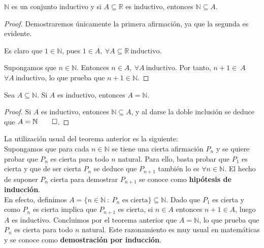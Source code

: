 \begin{teo}
    $\mathbb{N}$ es un conjunto inductivo y si $A \subseteq \mathbb{R}$ es inductivo, entonces $\mathbb{N} \subseteq A$.
\end{teo}
\begin{proof}
    Demostraremos únicamente la primera afirmación, ya que la segunda es evidente.
    
    Es claro que $1 \in \mathbb{N}$, pues $1 \in A, ~\forall A \subseteq \mathbb{R} ~\text{inductivo}$.
    
    Supongamos que $n \in \mathbb{N}$. Entonces $n \in A, ~\forall A ~\text{inductivo}$. Por tanto,
    $n+1 \in~A$ $\forall A ~\text{inductivo}$, lo que prueba que $n+1 \in \mathbb{N}$.
\end{proof}

\begin{teo}
    Sea $A \subseteq \mathbb{N}$. Si $A$ es inductivo, entonces $A = \mathbb{N}$.
\end{teo}
\begin{proof}
    Si $A$ es inductivo, entonces $\mathbb{N} \subseteq A$, y al darse la doble inclusión se deduce que $A = \mathbb{N} \qed$.
\end{proof}

\vspace{0.5cm}
La utilización usual del teorema anterior es la siguiente:\\

Supongamos que para cada $n \in \mathbb{N}$ se tiene una cierta afirmación $P_n$ y se quiere probar que
$P_n$ es cierta para todo $n$ natural. Para ello, basta probar que $P_1$ es cierta y que de ser cierta
$P_n$ se deduce que $P_{n+1}$ también lo es $\forall n \in \mathbb{N}$. El hecho de suponer
$P_n$ cierta para demostrar $P_{n+1}$ se conoce como \textbf{hipótesis de inducción}.\\

En efecto, definimos $A = \{n \in \mathbb{N} ~:~\text{$P_n$ es cierta}\} \subseteq \mathbb{N}$. Dado que $P_1$ es cierta y como
$P_n$ es cierta implica que $P_{n+1}$ es cierta, si $n \in A$ entonces $n+1 \in A$, luego $A$
es inductivo. Concluimos por el teorema anterior que $A = \mathbb{N}$, lo que prueba que $P_n$ es cierta para todo $n$
natural. Este razonamiento es muy usual en matemáticas y se conoce como \textbf{demostración por inducción}.

